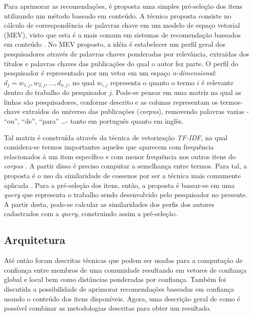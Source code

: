 \documentclass[12pt]{article}
\begin{document}
Para aprimorar as recomendações, é proposta uma simples pré-seleção dos itens utilizando um método baseado em conteúdo. A 
técnica proposta consiste no cálculo de correspondência de palavras chave em um modelo de espaço vetorial (MEV), visto que 
esta é a mais comum em sistemas de recomendação baseados em conteúdo \cite{ricci2011introduction}. No MEV proposto, a idéia é estabelecer um 
perfil geral dos pesquisadores através de palavras chaves ponderadas por relevância, extraídas dos títulos e palavras chaves 
das publicações do qual o autor fez parte. O perfil do pesquisador é representado por um vetor em um espaço \textit{n-dimensional}: 
$d_j = {w_{1,j}, w_{2,j}, \dots ,d_{n,j}}$, no qual $w_{i,j}$ representa o quanto o termo $i$ é relevante dentro do trabalho do 
pesquisador $j$. Pode-se pensar em uma matriz na qual as linhas são pesquisadores, conforme descrito e as colunas representam os 
termos-chave extraídos do universo das publicações (\textit{corpus}), removendo palavras vazias - “ou”, “de”, “para” \dots - 
tanto em português quanto em inglês.

\newpage

Tal matriz é construída através da técnica de vetorização \textit{TF-IDF}, na qual considera-se termos importantes aqueles que 
aparecem com frequência relacionados á um item específico e com menor frequência nos outros itens do \textit{corpus} 
\cite{pazzani2007content}. A partir disso é preciso computar a semelhança entre termos. Para tal, a proposta é o uso da 
similaridade de cossenos por ser a técnica mais comumente aplicada \cite{ricci2011introduction}. Para a pré-seleção dos itens, então, a 
proposta é basear-se em uma \textit{query} que representa o trabalho sendo desenvolvido pelo pesquisador no presente. A partir 
desta, pode-se calcular as similaridades dos perfis dos autores cadastrados com a \textit{query}, construindo assim a pré-seleção.

\subsection{Arquitetura} \label{sect:arch}

Até então foram descritas técnicas que podem ser usadas para a computação de confiança entre membros de uma comunidade resultando 
em vetores de confiança global e local bem como distâncias ponderadas por confiança. Também foi discutida a possibilidade de 
aprimorar recomendações baseadas em confiança usando o conteúdo dos itens disponíveis. Agora, uma descrição geral de como é 
possível combinar as metodologias descritas para obter um resultado. 
\end{document}
